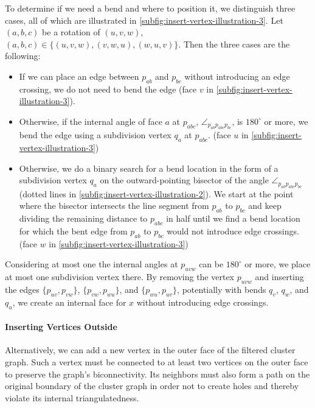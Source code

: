 To determine if we need a bend and where to position it, we distinguish three cases, all of which are illustrated in \cref{subfig:insert-vertex-illustration-3}.
Let $(a,b,c)$ be a rotation of $(u,v,w)$, \ie{} $(a,b,c) \in \{(u,v,w), (v,w,u), (w,u,v)\}$.
Then the three cases are the following:
%
\begin{itemize}
\item If we can place an edge between $p_{ab}$ and $p_{bc}$ without introducing an edge crossing, we do not need to bend the edge (face $v$ in \cref{subfig:insert-vertex-illustration-3}).
\item Otherwise, if the internal angle of face $a$ at $p_{abc}$, $\angle_{p_{ab}p_{abc}p_{bc}}$, is $180^\circ$ or more, we bend the edge using a subdivision vertex $q_a$ at $p_{abc}$.
(face $u$ in \cref{subfig:insert-vertex-illustration-3})
\item Otherwise, we do a binary search for a bend location in the form of a subdivision vertex $q_a$ on the outward-pointing bisector of the angle $\angle_{p_{ab}p_{abc}p_{bc}}$ (dotted lines in \cref{subfig:insert-vertex-illustration-2}).
We start at the point where the bisector intersects the line segment from $p_{ab}$ to $p_{bc}$ and keep dividing the remaining distance to $p_{abc}$ in half until we find a bend location for which the bent edge from $p_{ab}$ to $p_{bc}$ would not introduce edge crossings.
(face $w$ in \cref{subfig:insert-vertex-illustration-3})
\end{itemize}

Considering at most one the internal angles at $p_{uvw}$ can be $180^\circ$ or more, we place at most one subdivision vertex there.
By removing the vertex $p_{uvw}$ and inserting the edges $\{p_{uv},p_{vw}\}$, $\{p_{vw},p_{wu}\}$, and $\{p_{wu},p_{uv}\}$, potentially with bends $q_v$, $q_w$, and $q_u$, we create an internal face for $x$ without introducing edge crossings.



\paragraph{Inserting Vertices Outside}

Alternatively, we can add a new vertex in the outer face of the filtered cluster graph.
Such a vertex must be connected to at least two vertices on the outer face to preserve the graph's biconnectivity.
Its neighbors must also form a path on the original boundary of the cluster graph in order not to create holes and thereby violate its internal triangulatedness.

